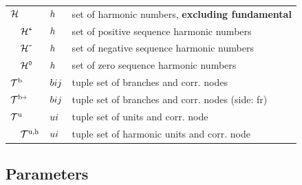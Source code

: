 \documentclass[journal]{IEEEtran}
\begin{document}
\begin{table}[H]
\begin{tabular}{l l l }
        $\mathcal{H}$                          & $h$   & set of harmonic numbers, \textbf{excluding fundamental}   \\ 
        $\quad \mathcal{H}^{\texttt{+}}$            & $h$   & set of positive sequence harmonic numbers                 \\ 
        $\quad \mathcal{H}^{\texttt{-}}$            & $h$   & set of negative sequence harmonic numbers                 \\ 
        $\quad \mathcal{H}^{\texttt{0}}$                & $h$   & set of zero sequence harmonic numbers                     \\ \hline
        $\mathcal{T}^{\text{b}}$                         & $bij$  & tuple set of branches and corr. nodes                     \\ 
        $\LineTupleSetFr$                       & $bij$  & tuple set of branches and corr. nodes (side: fr)          \\
        $\mathcal{T}^{\text{u}}$                         & $ui$  & tuple set of units and corr. node                         \\
        $\quad \mathcal{T}^{\text{u,h}}$           & $ui$  & tuple set of harmonic units and corr. node                \\
    \end{tabular}
\end{table}

\subsection{Parameters}
\end{document}
